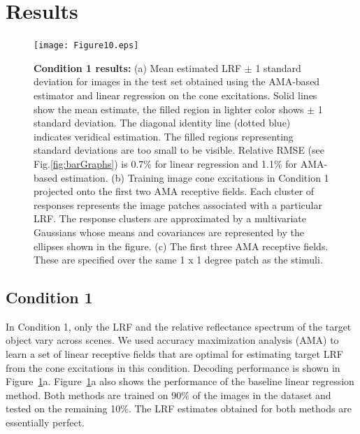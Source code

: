 \documentclass{jov}
\begin{document}
\section{Results} \label{Results}
\begin{figure}
\centering
\texttt{[image: Figure10.eps]}
    \caption{{\bf Condition 1 results:} (a) Mean estimated LRF $\pm$ 1 standard deviation for images in the test set obtained using the AMA-based estimator and linear regression on the cone excitations. Solid lines show the mean estimate, the filled region in lighter color shows $\pm$ 1 standard deviation. The diagonal identity line (dotted blue) indicates veridical estimation. The filled regions representing standard deviations are too small to be visible. Relative RMSE (see Fig.\ref{fig:barGraphs}) is 0.7\% for linear regression and 1.1\%  for AMA-based estimation. (b) Training image cone excitations in Condition 1 projected onto the first two AMA receptive fields. Each cluster of responses represents the image patches associated with a particular LRF. The response clusters are approximated by a multivariate Gaussians whose means and covariances are represented by the ellipses shown in the figure. (c) The first three AMA receptive fields. These are specified over the same 1 x 1 degree patch as the stimuli.}
\label{fig:Condition1}
\end{figure}

\subsection{Condition 1}
In Condition 1, only the LRF and the relative reflectance spectrum of the target object vary across scenes.
We used accuracy maximization analysis (AMA) to learn a set of linear receptive fields that are optimal for estimating target LRF from the cone excitations in this condition. 
Decoding performance is shown in Figure~\ref{fig:Condition1}a. 
Figure~\ref{fig:Condition1}a also shows the performance of the baseline linear regression method. 
Both methods are trained on 90\% of the images in the dataset and tested on the remaining 10\%.
The LRF estimates obtained for both methods are essentially perfect.
\end{document}
